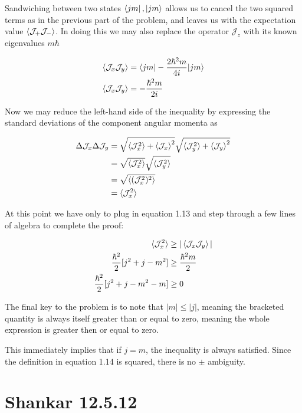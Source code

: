 \documentclass[paper=a4, fontsize=11pt]{scrartcl} %
\numberwithin{equation}{section} %
\numberwithin{figure}{section} %
\numberwithin{table}{section} %
\begin{document}
Sandwiching between two states $\bra{jm},\ket{jm}$ allows us to cancel the two squared terms as in the previous part of the problem, and leaves us with the expectation value $\braket{\mathcal{J}_+ \mathcal{J}_-}$. In doing this we may also replace the operator $\mathcal{J}_z$ with its known eigenvalues $m \hbar$

\begin{align}
\braket{\mathcal{J}_x \mathcal{J}_y} &= \braket{jm|-\frac{2 \hbar^2 m}{4i}|jm} \\
\braket{\mathcal{J}_x \mathcal{J}_y} &=-\frac{\hbar^2 m}{2i}
\end{align}

Now we may reduce the left-hand side of the inequality by expressing the standard deviations of the component angular momenta as

\begin{align}
\Delta \mathcal{J}_x \Delta \mathcal{J}_y &= \sqrt{\braket{\mathcal{J}_x^2} + \braket{\mathcal{J}_x}^2} \sqrt{\braket{\mathcal{J}_y^2} + \braket{\mathcal{J}_y}^2} \\
&= \sqrt{\braket{\mathcal{J}_x^2}} \sqrt{\braket{\mathcal{J}_y^2}} \\
&= \sqrt{\braket{(\mathcal{J}_x^2)^2}} \\
&= \braket{\mathcal{J}_x^2} \\
\end{align}

At this point we have only to plug in equation 1.13 and step through a few lines of algebra to complete the proof:

\begin{align}
\braket{\mathcal{J}_x^2} &\geq |\braket{\mathcal{J}_x \mathcal{J}_y}| \\
\frac{\hbar^2}{2} [j^2 + j - m^2] &\geq \frac{\hbar^2 m}{2} \\
\frac{\hbar^2}{2}[j^2 + j - m^2 - m] &\geq 0 \\
\end{align}

The final key to the problem is to note that $|m| \leq |j|$, meaning the bracketed quantity is always itself greater than or equal to zero, meaning the whole expression is greater then or equal to zero.

This immediately implies that if $j = m$, the inequality is always satisfied. Since the definition in equation 1.14 is squared, there is no $\pm$ ambiguity. 


\section{Shankar 12.5.12}
\end{document}
